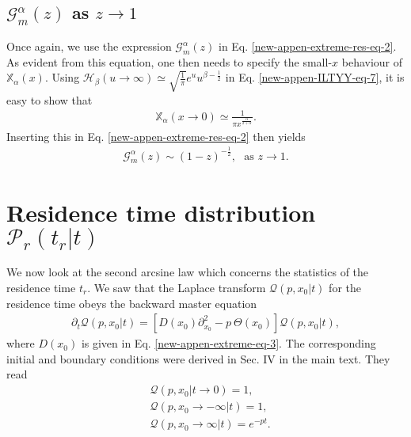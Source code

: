 \documentclass[superscriptaddress,amsmath,amssymb,aps,onecolumn]{revtex4}
\begin{document}
\subsection{$\mathcal{G}_m^{\alpha}(z)$ as $z \to 1$}
Once again, we use the expression $\mathcal{G}_m^{\alpha}(z)$ in Eq. \eqref{new-appen-extreme-res-eq-2}. As evident from this equation, one then needs to specify the small-$x$ behaviour of $\mathbb{X}_{\alpha}(x)$. Using $\mathcal{H}_{\beta}\left(u \to \infty\right) \simeq \sqrt{\frac{1}{\pi}} e^{u} u^{\beta -\frac{1}{2}}$ in Eq. \eqref{new-appen-ILTYY-eq-7}, it is easy to show that
\begin{align}
\mathbb{X}_{\alpha}\left(x \to 0 \right) \simeq \frac{1}{\pi x^{\frac{\alpha}{2+\alpha}}}.
\end{align} 
Inserting this in Eq. \eqref{new-appen-extreme-res-eq-2} then yields
\begin{align}
\mathcal{G}_m^{\alpha}(z) \sim (1-z)^{-\frac{1}{2}},~~~\text{as } z \to 1.
\end{align}


\section{Residence time distribution $\mathcal{P}_r \left( t_r|t \right)$}
\label{appen-sol-resi}
We now look at the second arcsine law which concerns the statistics of the residence time $t_r$. We saw that the Laplace transform  $\mathcal{Q}(p,x_0|t)$ for the residence time obeys the backward master equation
\begin{align}
\partial _t \mathcal{Q}(p,x_0|t) = \left[D(x_0) \partial _{x_0}^2-p~ \Theta (x_0) \right]\mathcal{Q}(p,x_0|t),
\label{new-appen-resi-eq-3}
\end{align}
where $D(x_0)$ is given in Eq. \eqref{new-appen-extreme-eq-3}. The corresponding initial and boundary conditions were derived in Sec.  IV in the main text. They read
\begin{align}
& \mathcal{Q}(p,x_0|t \to 0) = 1, \label{new-appen-resi-eq-4}\\
& \mathcal{Q}(p,x_0 \to -\infty |t) = 1, \label{new-appen-resi-eq-5} \\
& \mathcal{Q}(p,x_0 \to \infty |t) = e^{-pt}. \label{new-appen-resi-eq-6}
\end{align}
\end{document}
